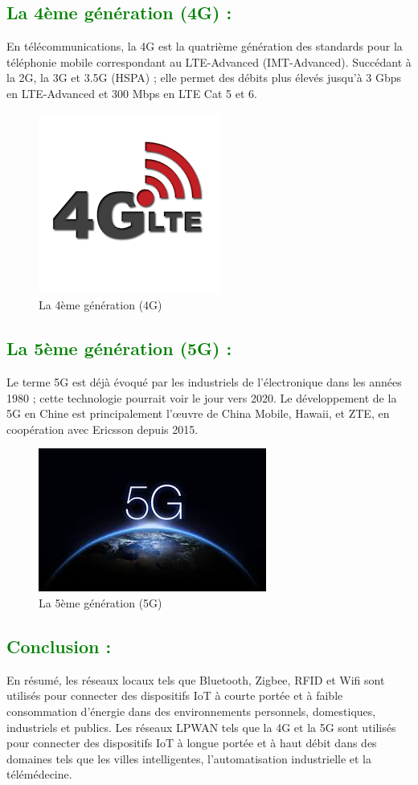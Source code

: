 \begin{flushleft}
	\subsection{\textcolor{green}{La 4ème génération (4G)  :}}
	En télécommunications, la 4G est la quatrième génération des
	standards pour la téléphonie mobile correspondant au LTE-Advanced
	(IMT-Advanced). Succédant à la 2G, la 3G et 3.5G (HSPA) ; elle permet
	des débits plus élevés jusqu’à 3 Gbps en LTE-Advanced et 300 Mbps en
	LTE Cat 5 et 6.
	\begin{figure}[h]
		\centering
		\includegraphics{chapitres/images/4g.png}
		\caption{La 4ème génération (4G)}
		\label{fig:labelname}
	\end{figure}

	\subsection{\textcolor{green}{La 5ème génération (5G) :}}
	Le terme 5G est déjà évoqué par les industriels de l'électronique
	dans les années 1980 ; cette technologie pourrait voir le jour vers 2020.
	Le développement de la 5G en Chine est principalement l'œuvre de China
	Mobile, Hawaii, et ZTE, en coopération avec Ericsson depuis 2015.
	\begin{figure}[h]
		\centering
		\includegraphics{chapitres/images/5g.jpg}
		\caption{La 5ème génération (5G)}
		\label{fig:labelname}
	\end{figure}
	\newpage
	\subsection{\textcolor{green}{Conclusion :}}
		En résumé, les réseaux locaux tels que Bluetooth, Zigbee, RFID et Wifi sont utilisés pour connecter des dispositifs IoT à courte portée et à faible consommation d'énergie dans des environnements personnels, domestiques, industriels et publics. Les réseaux LPWAN tels que la 4G et la 5G sont utilisés pour connecter des dispositifs IoT à longue portée et à haut débit dans des domaines tels que les villes intelligentes, l'automatisation industrielle et la télémédecine.

\end{flushleft}
\newpage







